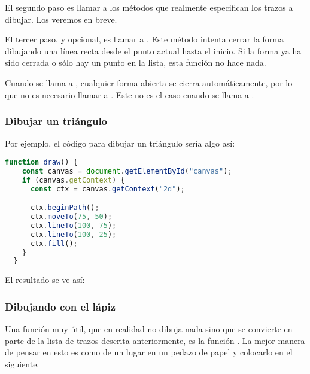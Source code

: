 El segundo paso es llamar a los métodos que realmente especifican los trazos a dibujar. Los veremos en breve.

El tercer paso, y opcional, es llamar a . Este método intenta cerrar la forma dibujando una línea recta desde el punto actual hasta el inicio. Si la forma ya ha sido cerrada o sólo hay un punto en la lista, esta función no hace nada.

\vspace{0.5cm} %
\begin{tcolorbox}
	[colback=red!5!white,colframe=cyan,fonttitle=\bfseries,title={\faLightbulbO\, Nota:}]

	Cuando se llama a , cualquier forma abierta se cierra automáticamente, por lo que no es necesario llamar a . Este no es el caso cuando se llama a .
\end{tcolorbox}
\vspace{0.5cm} %

\newpage %
\subsubsection{Dibujar un triángulo}
Por ejemplo, el código para dibujar un triángulo sería algo así:

\vspace{0.5cm} %
\begin{lstlisting}[language=TypeScript, style=mystyle]
  function draw() {
    const canvas = document.getElementById("canvas");
    if (canvas.getContext) {
      const ctx = canvas.getContext("2d");

      ctx.beginPath();
      ctx.moveTo(75, 50);
      ctx.lineTo(100, 75);
      ctx.lineTo(100, 25);
      ctx.fill();
    }
  }
\end{lstlisting}
\vspace{0.5cm} %

El resultado se ve así:

\begin{center}
\end{center}
\vspace{0.5cm} %

\subsubsection{Dibujando con el lápiz}
Una función muy útil, que en realidad no dibuja nada sino que se convierte en parte de la lista de trazos descrita anteriormente, es la función . La mejor manera de pensar en esto es como  de un lugar en un pedazo de papel y colocarlo en el siguiente.

